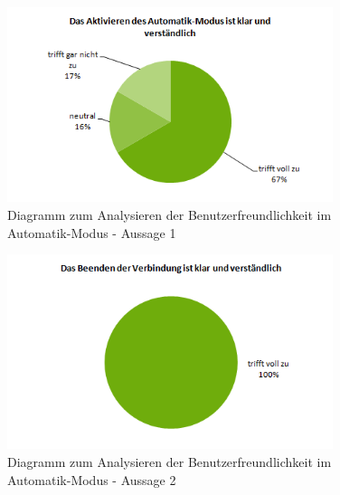 \begin{figure}[H]
	\centering
		\includegraphics[width=0.85\textwidth]{03_Grafiken/Anhang/UsabilityDiagramme/Aufgabenteil5Aussage1.png}
	\caption[Diagramm zum Analysieren der Benutzerfreundlichkeit im Automatik-Modus - Aussage 1]{Diagramm zum Analysieren der Benutzerfreundlichkeit im Automatik-Modus - Aussage 1}
	\label{fig:Aufgabenteil5Aussage1}
\end{figure}
\begin{figure}[H]
	\centering
		\includegraphics[width=0.85\textwidth]{03_Grafiken/Anhang/UsabilityDiagramme/Aufgabenteil5Aussage2.png}
	\caption[Diagramm zum Analysieren der Benutzerfreundlichkeit im Automatik-Modus - Aussage 2]{Diagramm zum Analysieren der Benutzerfreundlichkeit im Automatik-Modus - Aussage 2}
	\label{fig:Aufgabenteil5Aussage2}
\end{figure}